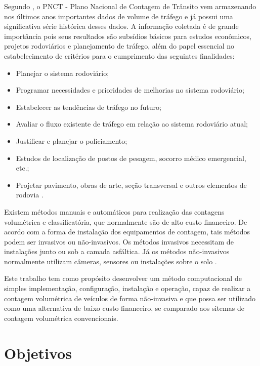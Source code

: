 Segundo \cite{dnit:2011:online}, o PNCT - Plano Nacional de Contagem de Trânsito vem armazenando nos últimos anos importantes dados de volume de tráfego e já possui uma significativa série histórica desses dados. A informação coletada é de grande importância pois seus resultados são subsídios básicos para estudos econômicos, projetos rodoviários e planejamento de tráfego, além do papel essencial no estabelecimento de critérios para o cumprimento das seguintes finalidades:

\begin{itemize}
  \item Planejar o sistema rodoviário;
  \item Programar necessidades e prioridades de melhorias no sistema rodoviário;
  \item Estabelecer as tendências de tráfego no futuro;
  \item Avaliar o fluxo existente de tráfego em relação ao sistema rodoviário atual;
  \item Justificar e planejar o policiamento;
  \item Estudos de localização de postos de pesagem, socorro médico emergencial, etc.;
  \item Projetar pavimento, obras de arte, seção transversal e outros elementos de rodovia \citep{dnit:2011:online}. 
\end{itemize}

Existem métodos manuais e automáticos para realização das contagens volumétrica e classificatória, que normalmente são de alto custo financeiro. De acordo com a forma de instalação dos equipamentos de contagem, tais métodos podem ser invasivos ou não-invasivos. Os métodos invasivos necessitam de instalações junto ou sob a camada asfáltica. Já os métodos não-invasivos normalmente utilizam câmeras, sensores ou instalações sobre o solo \citep{goldner:2009:misc}.

Este trabalho tem como propósito desenvolver um método computacional de simples implementação, configuração, instalação e operação, capaz de realizar a contagem volumétrica de veículos de forma não-invasiva e que possa ser utilizado como uma alternativa de baixo custo financeiro, se comparado aos sitemas de contagem volumétrica convencionais.

\section{Objetivos} %
\label{sec:objetivos}

